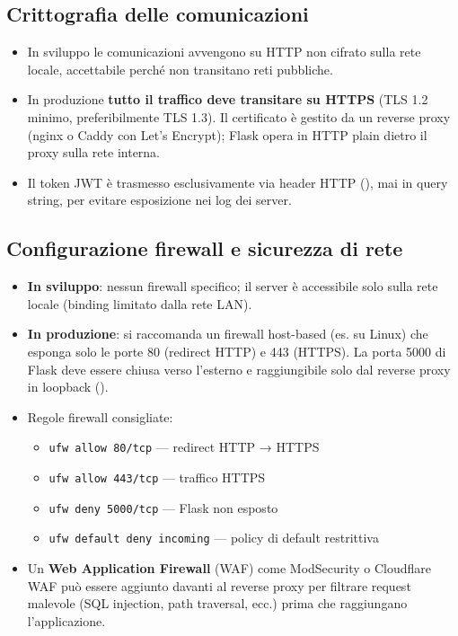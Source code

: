 \subsection{Crittografia delle comunicazioni}
\begin{itemize}
    \item In sviluppo le comunicazioni avvengono su HTTP non cifrato sulla
    rete locale, accettabile perché non transitano reti pubbliche.
    \item In produzione \textbf{tutto il traffico deve transitare su HTTPS}
    (TLS 1.2 minimo, preferibilmente TLS 1.3). Il certificato è gestito da
    un reverse proxy (nginx o Caddy con Let's Encrypt); Flask opera in
    HTTP plain dietro il proxy sulla rete interna.
    \item Il token JWT è trasmesso esclusivamente via header HTTP
    (), mai in query string, per evitare
    esposizione nei log dei server.
\end{itemize}

\subsection{Configurazione firewall e sicurezza di rete}
\begin{itemize}
    \item \textbf{In sviluppo}: nessun firewall specifico; il server è
    accessibile solo sulla rete locale (binding 
    limitato dalla rete LAN).
    \item \textbf{In produzione}: si raccomanda un firewall host-based
    (es.  su Linux) che esponga solo le porte 80 (redirect HTTP)
    e 443 (HTTPS). La porta 5000 di Flask deve essere chiusa verso
    l'esterno e raggiungibile solo dal reverse proxy in loopback
    ().
    \item Regole firewall consigliate:
    \begin{itemize}
        \item \texttt{ufw allow 80/tcp} — redirect HTTP → HTTPS
        \item \texttt{ufw allow 443/tcp} — traffico HTTPS
        \item \texttt{ufw deny 5000/tcp} — Flask non esposto
        \item \texttt{ufw default deny incoming} — policy di default restrittiva
    \end{itemize}
    \item Un \textbf{Web Application Firewall} (WAF) come ModSecurity o
    Cloudflare WAF può essere aggiunto davanti al reverse proxy per
    filtrare request malevole (SQL injection, path traversal, ecc.) prima
    che raggiungano l'applicazione.
\end{itemize}

